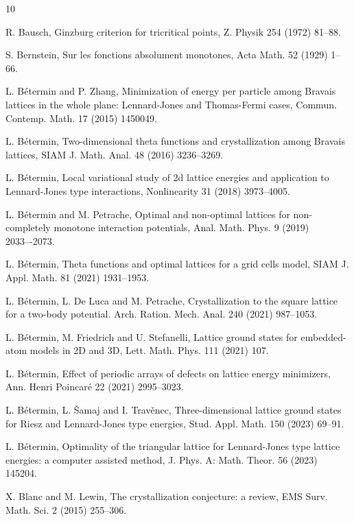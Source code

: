 \documentclass[12pt]{interact}
\theoremstyle{definition}
\begin{document}
\begin{thebibliography}{10}

 R. Bausch,
Ginzburg criterion for tricritical points,
Z. Physik 254 (1972) 81--88.

 S. Bernstein, 
Sur les fonctions absolument monotones, 
Acta Math. 52 (1929) 1--66.

 L. B\'etermin and P. Zhang,
Minimization of energy per particle among Bravais lattices in the whole plane:
Lennard-Jones and Thomas-Fermi cases,
Commun. Contemp. Math. 17 (2015) 1450049. 

 L. B\'etermin,
Two-dimensional theta functions and crystallization among Bravais lattices,
SIAM J. Math. Anal. 48 (2016) 3236--3269.

 L. B\'etermin,
Local variational study of 2d lattice energies and application to
Lennard-Jones type interactions,
Nonlinearity 31 (2018) 3973--4005.

 L. B\'etermin and M. Petrache,
Optimal and non-optimal lattices for non-completely monotone interaction
potentials,
Anal. Math. Phys. 9 (2019) 2033–-2073. 
  
 L. B\'etermin,
Theta functions and optimal lattices for a grid cells model,
SIAM J. Appl. Math. 81 (2021) 1931--1953.
  
 L. B\'etermin, L. De Luca and M. Petrache,
Crystallization to the square lattice for a two-body potential.
Arch. Ration. Mech. Anal. 240 (2021) 987--1053.
  
 L. B\'etermin, M. Friedrich and U. Stefanelli,
Lattice ground states for embedded-atom models in 2D and 3D,
Lett. Math. Phys. 111 (2021) 107.
  
 L. B\'etermin,
Effect of periodic arrays of defects on lattice energy minimizers,
Ann. Henri Poincar\'e 22 (2021) 2995--3023.
  
 L. B\'etermin, L. \v{S}amaj and I. Trav\v{e}nec,
Three-dimensional lattice ground states for Riesz and Lennard-Jones type
energies,
Stud. Appl. Math. 150 (2023) 69--91.
  
 L. B\'etermin,
Optimality of the triangular lattice for Lennard-Jones type lattice energies:
a computer assisted method,
J. Phys. A: Math. Theor. 56 (2023) 145204.

 X. Blanc and M. Lewin,
The crystallization conjecture: a review,
EMS Surv. Math. Sci. 2 (2015) 255--306.


\end{thebibliography}
\end{document}
